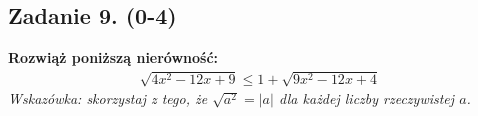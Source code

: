 \subsection*{Zadanie 9. (0-4)}
\textbf{Rozwiąż poniższą nierówność:}
\begin{align*}
\sqrt{4x^{2}-12x+9}\leq 1+\sqrt{9x^{2}-12x+4}
\end{align*}
\emph{Wskazówka: skorzystaj z tego, że $\sqrt{a^{2}}=|a|$ dla każdej liczby rzeczywistej $a$.}